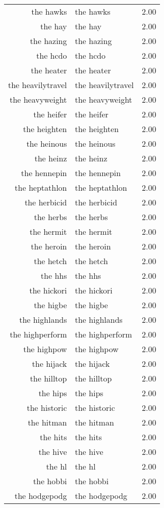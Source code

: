 \begin{table}[ht]
\begin{tabular}{rlr}
  the hawks & the hawks & 2.00 \\ 
  the hay & the hay & 2.00 \\ 
  the hazing & the hazing & 2.00 \\ 
  the hcdo & the hcdo & 2.00 \\ 
  the heater & the heater & 2.00 \\ 
  the heavilytravel & the heavilytravel & 2.00 \\ 
  the heavyweight & the heavyweight & 2.00 \\ 
  the heifer & the heifer & 2.00 \\ 
  the heighten & the heighten & 2.00 \\ 
  the heinous & the heinous & 2.00 \\ 
  the heinz & the heinz & 2.00 \\ 
  the hennepin & the hennepin & 2.00 \\ 
  the heptathlon & the heptathlon & 2.00 \\ 
  the herbicid & the herbicid & 2.00 \\ 
  the herbs & the herbs & 2.00 \\ 
  the hermit & the hermit & 2.00 \\ 
  the heroin & the heroin & 2.00 \\ 
  the hetch & the hetch & 2.00 \\ 
  the hhs & the hhs & 2.00 \\ 
  the hickori & the hickori & 2.00 \\ 
  the higbe & the higbe & 2.00 \\ 
  the highlands & the highlands & 2.00 \\ 
  the highperform & the highperform & 2.00 \\ 
  the highpow & the highpow & 2.00 \\ 
  the hijack & the hijack & 2.00 \\ 
  the hilltop & the hilltop & 2.00 \\ 
  the hips & the hips & 2.00 \\ 
  the historic & the historic & 2.00 \\ 
  the hitman & the hitman & 2.00 \\ 
  the hits & the hits & 2.00 \\ 
  the hive & the hive & 2.00 \\ 
  the hl & the hl & 2.00 \\ 
  the hobbi & the hobbi & 2.00 \\ 
  the hodgepodg & the hodgepodg & 2.00 \\ 

\end{tabular}
\end{table}
